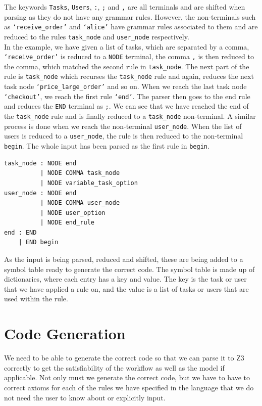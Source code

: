 \documentclass[a4paper]{report}
\begin{document}
The keywords \texttt{Tasks}, \texttt{Users}, \texttt{:}, \texttt{;} and \texttt{,} are all terminals and are shifted when parsing as they do not have any grammar rules. However, the non-terminals such as \texttt{`receive\_order'} and \texttt{`alice'} have grammar rules associated to them and are reduced to the rules \texttt{task\_node} and \texttt{user\_node} respectively. \\

In the example, we have given a list of tasks, which are separated by a comma, \texttt{`receive\_order'} is reduced to a \texttt{NODE} terminal, the comma \texttt{,} is then reduced to the comma, which matched the second rule in \texttt{task\_node}. The next part of the rule is \texttt{task\_node} which recurses the \texttt{task\_node} rule and again, reduces the next task node \texttt{`price\_large\_order'} and so on. When we reach the last task node \texttt{`checkout'}, we reach the first rule \texttt{`end'}. The parser then goes to the end rule and reduces the \texttt{END} terminal as \texttt{;}. We can see that we have reached the end of the \texttt{task\_node} rule and is finally reduced to a \texttt{task\_node} non-terminal. A similar process is done when we reach the non-terminal \texttt{user\_node}. When the list of users is reduced to a \texttt{user\_node}, the rule is then reduced to the non-terminal \texttt{begin}. The whole input has been parsed as the first rule in \texttt{begin}.
\begin{lstlisting}[frame=single]
task_node : NODE end
          | NODE COMMA task_node
          | NODE variable_task_option
user_node : NODE end
          | NODE COMMA user_node
          | NODE user_option
          | NODE end_rule
end : END
    | END begin
\end{lstlisting}

As the input is being parsed, reduced and shifted, these are being added to a symbol table ready to generate the correct code. The symbol table is made up of dictionaries, where each entry has a key and value. The key is the task or user that we have applied a rule on, and the value is a list of tasks or users that are used within the rule. \\

\section{Code Generation}
We need to be able to generate the correct code so that we can parse it to Z3 correctly to get the satisfiability of the workflow as well as the model if applicable. Not only must we generate the correct code, but we have to have to correct axioms for each of the rules we have specified in the language that we do not need the user to know about or explicitly input.\\
\end{document}
